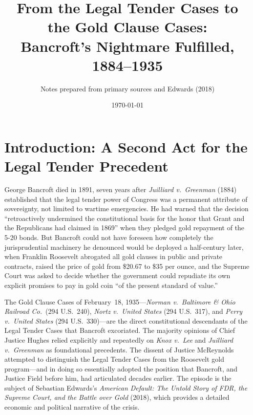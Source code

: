 \documentclass[12pt]{article}
\title{From the Legal Tender Cases to the Gold Clause Cases:\\
Bancroft's Nightmare Fulfilled, 1884--1935}
\author{Notes prepared from primary sources and Edwards (2018)}
\date{\today}
\begin{document}
\maketitle
\thispagestyle{empty}

\newpage
\tableofcontents
\newpage

\section{Introduction: A Second Act for the Legal Tender Precedent}

George Bancroft died in 1891, seven years after \textit{Juilliard v.\
Greenman} (1884) established that the legal tender power of Congress was
a permanent attribute of sovereignty, not limited to wartime emergencies.
He had warned that the decision ``retroactively undermined the
constitutional basis for the honor that Grant and the Republicans had
claimed in 1869'' when they pledged gold repayment of the 5-20 bonds.
But Bancroft could not have foreseen how completely the jurisprudential
machinery he denounced would be deployed a half-century later, when
Franklin Roosevelt abrogated all gold clauses in public and private
contracts, raised the price of gold from \$20.67 to \$35 per ounce, and
the Supreme Court was asked to decide whether the government could
repudiate its own explicit promises to pay in gold coin ``of the present
standard of value.''

The Gold Clause Cases of February~18, 1935---\textit{Norman v.\
Baltimore \& Ohio Railroad Co.}\ (294 U.S.\ 240), \textit{Nortz v.\
United States} (294 U.S.\ 317), and \textit{Perry v.\ United States}
(294 U.S.\ 330)---are the direct constitutional descendants of the
Legal Tender Cases that Bancroft excoriated. The majority opinions of
Chief Justice Hughes relied explicitly and repeatedly on \textit{Knox
v.\ Lee} and \textit{Juilliard v.\ Greenman} as foundational
precedents. The dissent of Justice McReynolds attempted to distinguish
the Legal Tender Cases from the Roosevelt gold program---and in doing
so essentially adopted the position that Bancroft, and Justice Field
before him, had articulated decades earlier. The episode is the subject
of Sebastian Edwards's \textit{American Default: The Untold Story of
FDR, the Supreme Court, and the Battle over Gold} (2018), which
provides a detailed economic and political narrative of the crisis.
\end{document}
